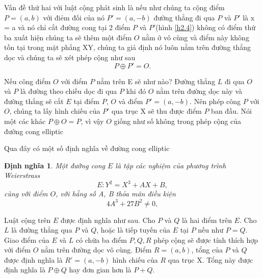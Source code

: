 \documentclass[a4paper,12pt]{report}
\newtheorem{definition}{Định nghĩa}[chapter]
\begin{document}
Vấn đề thứ hai với luật cộng phát sinh là nếu như chúng ta cộng điểm $P = (a, b)$ với điẻm đối của nó  $P' = (a, -b)$ đường thẳng đi qua $P$ và $P'$ là x = a và nó chỉ cắt đường cong tại 2 điểm $P$ và $P'$(hình \ref{h2.4}) không có điểm thứ ba xuất hiện chúng ta sẽ thêm một điểm $O$ nằm ở vô cùng và điểm này không tồn tại trong mặt phẳng XY, chúng ta giả định nó luôn nằm trên đường thẳng dọc và chúng ta sẽ xét phép cộng như sau
\begin{displaymath}
P \oplus P' = O.
\end{displaymath}

Nếu công điểm $O$ với điểm $P$ nằm trên E sẽ như nào? Đường thẳng $L$ đi qua $O$ và $P$ là đường theo chiều dọc đi qua $P$ khi đó $O$ nằm trên đường dọc này và đường thẳng sẽ cắt $E$ tại điểm $P$, $O$ và điểm $P' = (a , -b)$. Nên phép công $P$ với $O$, chúng ta lấy hình chiếu của $P'$ qua trục X sẽ thu được điểm $P$ ban đầu. Nói một các khác $P \oplus O = P$, vì vậy $O$ giống như số không trong phép cộng của đường cong elliptic

Qua đây có một số định nghĩa về đường cong elliptic
\\[6pt]
\begin{definition}
Một đường cong $E$ là tập các nghiệm của phương trình Weierstrass
\begin{displaymath}
E: Y^2 = X^3 + AX + B,
\end{displaymath}
cùng với điểm $O$, với hằng số A, B thỏa mãn điều kiện
\begin{displaymath}
4A^3 + 27B^2 \neq 0,
\end{displaymath}
\end{definition}

Luật cộng trên $E$ được định nghĩa như sau. Cho $P$ và $Q$ là hai điểm trên $E$. Cho $L$ là đường thẳng qua $P$ và $Q$, hoặc là tiếp tuyến của $E$ tại $P$ nếu như $P = Q$. Giao điểm của $E$ và $L$ có chứa ba điểm $P, Q, R$ phép cộng sẽ được tính thích hợp với điểm $O$ nằm trên đường dọc vô cùng. Điểm $R = (a, b)$, tổng của $P$ và $Q$ được định nghĩa là $R' = (a, -b)$ hình chiếu của $R$ qua trục X. Tổng này được định nghĩa là $P \oplus Q$ hay đơn gian hơn là $P + Q$.
\end{document}

